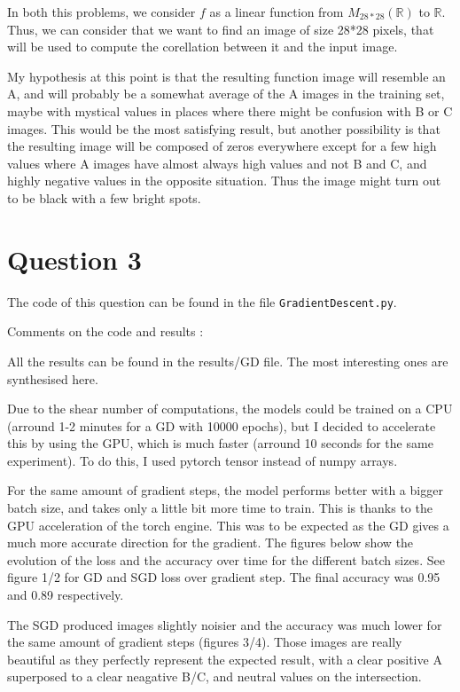 \documentclass{article}
\begin{document}
In both this problems, we consider $f$ as a linear function from $M_{28*28}(\mathbb{R})$ to $\mathbb{R}$. Thus, we can consider that we want to find an image of size 28*28 pixels, that will be used to compute the corellation between it and the input image.

My hypothesis at this point is that the resulting function image will resemble an A, and will probably be a somewhat average of the A images in the training set, maybe with mystical values in places where there might be confusion with B or C images. This would be the most satisfying result, but another possibility is that the resulting image will be composed of zeros everywhere except for a few high values where A images have almost always high values and not B and C, and highly negative values in the opposite situation. Thus the image might turn out to be black with a few bright spots.

\section{Question 3}

The code of this question can be found in the file \texttt{GradientDescent.py}.\newline

Comments on the code and results :\newline

All the results can be found in the results/GD file. The most interesting ones are synthesised here.

Due to the shear number of computations, the models could be trained on a CPU (arround 1-2 minutes for a GD with 10000 epochs), but I decided to accelerate this by using the GPU, which is much faster (arround 10 seconds for the same experiment). To do this, I used pytorch tensor instead of numpy arrays.

For the same amount of gradient steps, the model performs better with a bigger batch size, and takes only a little bit more time to train. This is thanks to the GPU acceleration of the torch engine.
This was to be expected as the GD gives a much more accurate direction for the gradient.
The figures below show the evolution of the loss and the accuracy over time for the different batch sizes.
See figure 1/2 for GD and SGD loss over gradient step. The final accuracy was 0.95 and 0.89 respectively.

The SGD produced images slightly noisier and the accuracy was much lower for the same amount of gradient steps (figures 3/4). Those images are really beautiful as they perfectly represent the expected result, with a clear positive A superposed to a clear neagative B/C, and neutral values on the intersection.\newline
\end{document}
